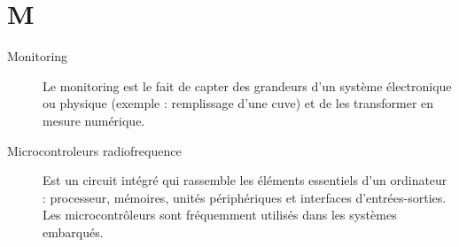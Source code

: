 \section{M}

\begin{description}

\item[Monitoring] Le monitoring est le fait de capter des grandeurs d'un système
électronique ou physique (exemple : remplissage d'une cuve) et de les transformer
 en mesure numérique.

 \item[Microcontroleurs radiofrequence]
 Est un circuit intégré qui rassemble les éléments essentiels d'un ordinateur : 
 processeur, mémoires, unités périphériques et interfaces d'entrées-sorties. 
 Les microcontrôleurs sont fréquemment utilisés dans les systèmes embarqués.

 
\end{description}


